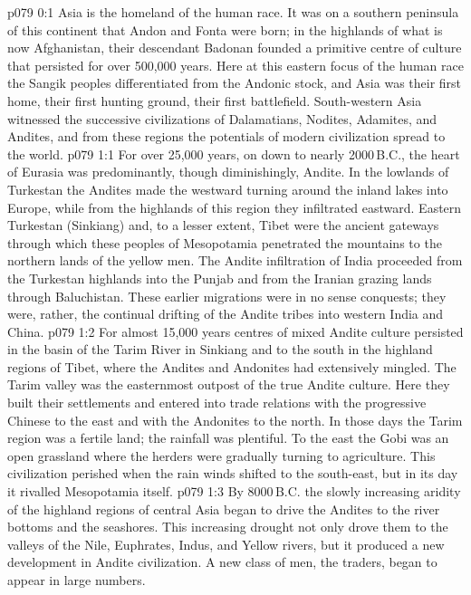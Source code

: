 \author{Archangel}
\vs p079 0:1 Asia is the homeland of the human race. It was on a southern peninsula of this continent that Andon and Fonta were born; in the highlands of what is now Afghanistan, their descendant Badonan founded a primitive centre of culture that persisted for over 500,000 years. Here at this eastern focus of the human race the Sangik peoples differentiated from the Andonic stock, and Asia was their first home, their first hunting ground, their first battlefield. South\hyp{}western Asia witnessed the successive civilizations of Dalamatians, Nodites, Adamites, and Andites, and from these regions the potentials of modern civilization spread to the world.
\vs p079 1:1 For over 25,000 years, on down to nearly 2000\,B.C., the heart of Eurasia was predominantly, though diminishingly, Andite. In the lowlands of Turkestan the Andites made the westward turning around the inland lakes into Europe, while from the highlands of this region they infiltrated eastward. Eastern Turkestan (Sinkiang) and, to a lesser extent, Tibet were the ancient gateways through which these peoples of Mesopotamia penetrated the mountains to the northern lands of the yellow men. The Andite infiltration of India proceeded from the Turkestan highlands into the Punjab and from the Iranian grazing lands through Baluchistan. These earlier migrations were in no sense conquests; they were, rather, the continual drifting of the Andite tribes into western India and China.
\vs p079 1:2 \pc For almost 15,000 years centres of mixed Andite culture persisted in the basin of the Tarim River in Sinkiang and to the south in the highland regions of Tibet, where the Andites and Andonites had extensively mingled. The Tarim valley was the easternmost outpost of the true Andite culture. Here they built their settlements and entered into trade relations with the progressive Chinese to the east and with the Andonites to the north. In those days the Tarim region was a fertile land; the rainfall was plentiful. To the east the Gobi was an open grassland where the herders were gradually turning to agriculture. This civilization perished when the rain winds shifted to the south\hyp{}east, but in its day it rivalled Mesopotamia itself.
\vs p079 1:3 \pc By 8000\,B.C. the slowly increasing aridity of the highland regions of central Asia began to drive the Andites to the river bottoms and the seashores. This increasing drought not only drove them to the valleys of the Nile, Euphrates, Indus, and Yellow rivers, but it produced a new development in Andite civilization. A new class of men, the traders, began to appear in large numbers.
